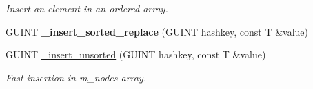 \begin{DoxyCompactItemize}
\begin{DoxyCompactList}\small\item\em Insert an element in an ordered array. \end{DoxyCompactList}\item 
\hypertarget{classgim__hash__table_ac221e1462f7711085b1260fc229b6183}{G\+U\+I\+N\+T {\bfseries \+\_\+insert\+\_\+sorted\+\_\+replace} (G\+U\+I\+N\+T hashkey, const T \&value)}\label{classgim__hash__table_ac221e1462f7711085b1260fc229b6183}

\item 
\hypertarget{classgim__hash__table_a95f93f63d75663f494388dc03423332f}{G\+U\+I\+N\+T \hyperlink{classgim__hash__table_a95f93f63d75663f494388dc03423332f}{\+\_\+insert\+\_\+unsorted} (G\+U\+I\+N\+T hashkey, const T \&value)}\label{classgim__hash__table_a95f93f63d75663f494388dc03423332f}

\begin{DoxyCompactList}\small\item\em Fast insertion in m\+\_\+nodes array. \end{DoxyCompactList}\end{DoxyCompactItemize}
